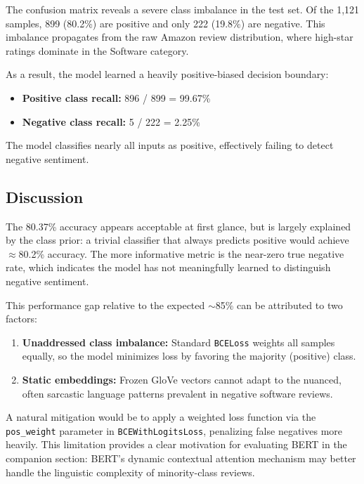 \documentclass[11pt, a4paper]{article}
\begin{document}
The confusion matrix reveals a severe class imbalance in the test set. Of the 1,121 samples, 899 (80.2\%) are positive and only 222 (19.8\%) are negative. This imbalance propagates from the raw Amazon review distribution, where high-star ratings dominate in the Software category.

As a result, the model learned a heavily positive-biased decision boundary:
\begin{itemize}
    \item \textbf{Positive class recall:} 896 / 899 = 99.67\%
    \item \textbf{Negative class recall:} 5 / 222 = 2.25\%
\end{itemize}

The model classifies nearly all inputs as positive, effectively failing to detect negative sentiment.

\subsection{Discussion}

The 80.37\% accuracy appears acceptable at first glance, but is largely explained by the class prior: a trivial classifier that always predicts positive would achieve $\approx$80.2\% accuracy. The more informative metric is the near-zero true negative rate, which indicates the model has not meaningfully learned to distinguish negative sentiment.

This performance gap relative to the expected $\sim$85\% can be attributed to two factors:

\begin{enumerate}
    \item \textbf{Unaddressed class imbalance:} Standard \texttt{BCELoss} weights all samples equally, so the model minimizes loss by favoring the majority (positive) class.
    \item \textbf{Static embeddings:} Frozen GloVe vectors cannot adapt to the nuanced, often sarcastic language patterns prevalent in negative software reviews.
\end{enumerate}

A natural mitigation would be to apply a weighted loss function via the \texttt{pos\_weight} parameter in \texttt{BCEWithLogitsLoss}, penalizing false negatives more heavily. This limitation provides a clear motivation for evaluating BERT in the companion section: BERT's dynamic contextual attention mechanism may better handle the linguistic complexity of minority-class reviews.
\end{document}
